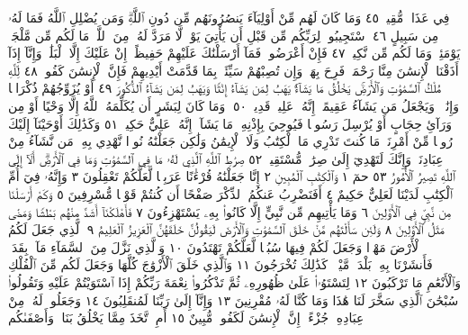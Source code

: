 فِي عَذَابࣲ مُّقِيمࣲ ٤٥ وَمَا كَانَ لَهُم مِّنْ أَوْلِيَآءَ يَنصُرُونَهُم
مِّن دُونِ ٱللَّهِۗ وَمَن يُضْلِلِ ٱللَّهُ فَمَا لَهُۥ مِن سَبِيلٍ ٤٦ ٱسْتَجِيبُوا۟
لِرَبِّكُم مِّن قَبْلِ أَن يَأْتِيَ يَوْمࣱ لَّا مَرَدَّ لَهُۥ مِنَ ٱللَّهِۚ مَا لَكُم
مِّن مَّلْجَإࣲ يَوْمَئِذࣲ وَمَا لَكُم مِّن نَّكِيرࣲ ٤٧ فَإِنْ أَعْرَضُوا۟
فَمَآ أَرْسَلْنَٰكَ عَلَيْهِمْ حَفِيظًاۖ إِنْ عَلَيْكَ إِلَّا ٱلْبَلَٰغُۗ وَإِنَّآ إِذَآ
أَذَقْنَا ٱلْإِنسَٰنَ مِنَّا رَحْمَةࣰ فَرِحَ بِهَاۖ وَإِن تُصِبْهُمْ سَيِّئَةُۢ
بِمَا قَدَّمَتْ أَيْدِيهِمْ فَإِنَّ ٱلْإِنسَٰنَ كَفُورࣱ ٤٨ لِّلَّهِ مُلْكُ
ٱلسَّمَٰوَٰتِ وَٱلْأَرْضِۚ يَخْلُقُ مَا يَشَآءُۚ يَهَبُ لِمَن يَشَآءُ إِنَٰثࣰا
وَيَهَبُ لِمَن يَشَآءُ ٱلذُّكُورَ ٤٩ أَوْ يُزَوِّجُهُمْ ذُكْرَانࣰا وَإِنَٰثࣰاۖ
وَيَجْعَلُ مَن يَشَآءُ عَقِيمًاۚ إِنَّهُۥ عَلِيمࣱ قَدِيرࣱ ٥٠۞ وَمَا كَانَ
لِبَشَرٍ أَن يُكَلِّمَهُ ٱللَّهُ إِلَّا وَحْيًا أَوْ مِن وَرَآئِ حِجَابٍ أَوْ يُرْسِلَ
رَسُولࣰا فَيُوحِيَ بِإِذْنِهِۦ مَا يَشَآءُۚ إِنَّهُۥ عَلِيٌّ حَكِيمࣱ ٥١
وَكَذَٰلِكَ أَوْحَيْنَآ إِلَيْكَ رُوحࣰا مِّنْ أَمْرِنَاۚ مَا كُنتَ تَدْرِي مَا ٱلْكِتَٰبُ
وَلَا ٱلْإِيمَٰنُ وَلَٰكِن جَعَلْنَٰهُ نُورࣰا نَّهْدِي بِهِۦ مَن نَّشَآءُ مِنْ عِبَادِنَاۚ
وَإِنَّكَ لَتَهْدِيٓ إِلَىٰ صِرَٰطࣲ مُّسْتَقِيمࣲ ٥٢ صِرَٰطِ ٱللَّهِ ٱلَّذِي لَهُۥ
مَا فِي ٱلسَّمَٰوَٰتِ وَمَا فِي ٱلْأَرْضِۗ أَلَآ إِلَى ٱللَّهِ تَصِيرُ ٱلْأُمُورُ ٥٣
حمٓ ١ وَٱلْكِتَٰبِ ٱلْمُبِينِ ٢ إِنَّا جَعَلْنَٰهُ قُرْءَٰنًا عَرَبِيࣰّا
لَّعَلَّكُمْ تَعْقِلُونَ ٣ وَإِنَّهُۥ فِيٓ أُمِّ ٱلْكِتَٰبِ لَدَيْنَا
لَعَلِيٌّ حَكِيمٌ ٤ أَفَنَضْرِبُ عَنكُمُ ٱلذِّكْرَ صَفْحًا
أَن كُنتُمْ قَوْمࣰا مُّسْرِفِينَ ٥ وَكَمْ أَرْسَلْنَا مِن نَّبِيࣲّ فِي
ٱلْأَوَّلِينَ ٦ وَمَا يَأْتِيهِم مِّن نَّبِيٍّ إِلَّا كَانُوا۟ بِهِۦ يَسْتَهْزِءُونَ ٧
فَأَهْلَكْنَآ أَشَدَّ مِنْهُم بَطْشࣰا وَمَضَىٰ مَثَلُ ٱلْأَوَّلِينَ ٨
وَلَئِن سَأَلْتَهُم مَّنْ خَلَقَ ٱلسَّمَٰوَٰتِ وَٱلْأَرْضَ لَيَقُولُنَّ
خَلَقَهُنَّ ٱلْعَزِيزُ ٱلْعَلِيمُ ٩ ٱلَّذِي جَعَلَ لَكُمُ ٱلْأَرْضَ
مَهْدࣰا وَجَعَلَ لَكُمْ فِيهَا سُبُلࣰا لَّعَلَّكُمْ تَهْتَدُونَ ١٠
وَٱلَّذِي نَزَّلَ مِنَ ٱلسَّمَآءِ مَآءَۢ بِقَدَرࣲ فَأَنشَرْنَا بِهِۦ بَلْدَةࣰ مَّيْتࣰاۚ
كَذَٰلِكَ تُخْرَجُونَ ١١ وَٱلَّذِي خَلَقَ ٱلْأَزْوَٰجَ كُلَّهَا وَجَعَلَ
لَكُم مِّنَ ٱلْفُلْكِ وَٱلْأَنْعَٰمِ مَا تَرْكَبُونَ ١٢ لِتَسْتَوُۥا۟ عَلَىٰ ظُهُورِهِۦ
ثُمَّ تَذْكُرُوا۟ نِعْمَةَ رَبِّكُمْ إِذَا ٱسْتَوَيْتُمْ عَلَيْهِ وَتَقُولُوا۟ سُبْحَٰنَ
ٱلَّذِي سَخَّرَ لَنَا هَٰذَا وَمَا كُنَّا لَهُۥ مُقْرِنِينَ ١٣ وَإِنَّآ إِلَىٰ رَبِّنَا
لَمُنقَلِبُونَ ١٤ وَجَعَلُوا۟ لَهُۥ مِنْ عِبَادِهِۦ جُزْءًاۚ إِنَّ ٱلْإِنسَٰنَ
لَكَفُورࣱ مُّبِينٌ ١٥ أَمِ ٱتَّخَذَ مِمَّا يَخْلُقُ بَنَاتࣲ وَأَصْفَىٰكُم
